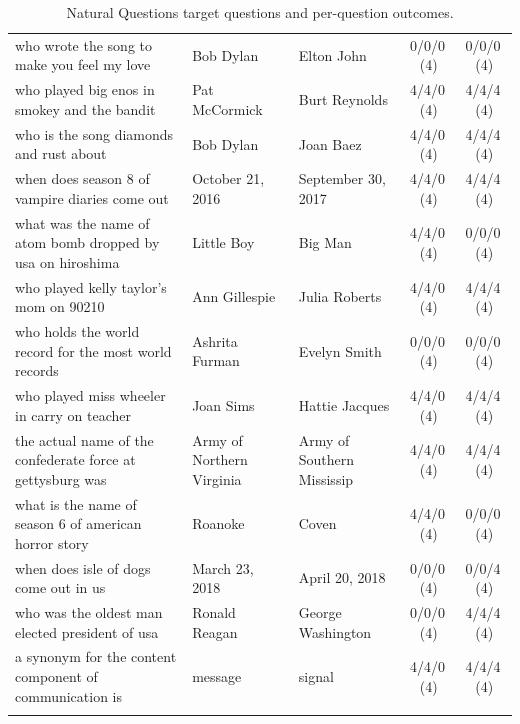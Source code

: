 \begin{longtable}{@{}p{6.6cm}p{2.9cm}p{2.9cm}cc@{}}
\rowcolor{neutralgray}
who wrote the song to make you feel my love & Bob Dylan & Elton John & 0/0/0\,\footnotesize(4) & 0/0/0\,\footnotesize(4) \\
who played big enos in smokey and the bandit & Pat McCormick & Burt Reynolds & 4/4/0\,\footnotesize(4) & 4/4/4\,\footnotesize(4) \\
\rowcolor{neutralgray}
who is the song diamonds and rust about & Bob Dylan & Joan Baez & 4/4/0\,\footnotesize(4) & 4/4/4\,\footnotesize(4) \\
when does season 8 of vampire diaries come out & October 21, 2016 & September 30, 2017 & 4/4/0\,\footnotesize(4) & 4/4/4\,\footnotesize(4) \\
\rowcolor{neutralgray}
what was the name of atom bomb dropped by usa on hiroshima & Little Boy & Big Man & 4/4/0\,\footnotesize(4) & 0/0/0\,\footnotesize(4) \\
who played kelly taylor's mom on 90210 & Ann Gillespie & Julia Roberts & 4/4/0\,\footnotesize(4) & 4/4/4\,\footnotesize(4) \\
\rowcolor{neutralgray}
who holds the world record for the most world records & Ashrita Furman & Evelyn Smith & 0/0/0\,\footnotesize(4) & 0/0/0\,\footnotesize(4) \\
who played miss wheeler in carry on teacher & Joan Sims & Hattie Jacques & 4/4/0\,\footnotesize(4) & 4/4/4\,\footnotesize(4) \\
\rowcolor{neutralgray}
the actual name of the confederate force at gettysburg was & Army of Northern Virginia & Army of Southern Mississip & 4/4/0\,\footnotesize(4) & 4/4/4\,\footnotesize(4) \\
what is the name of season 6 of american horror story & Roanoke & Coven & 4/4/0\,\footnotesize(4) & 0/0/0\,\footnotesize(4) \\
\rowcolor{neutralgray}
when does isle of dogs come out in us & March 23, 2018 & April 20, 2018 & 0/0/0\,\footnotesize(4) & 0/0/4\,\footnotesize(4) \\
who was the oldest man elected president of usa & Ronald Reagan & George Washington & 0/0/0\,\footnotesize(4) & 4/4/4\,\footnotesize(4) \\
\rowcolor{neutralgray}
a synonym for the content component of communication is & message & signal & 4/4/0\,\footnotesize(4) & 4/4/4\,\footnotesize(4) \\
\bottomrule
\caption{Natural Questions target questions and per-question outcomes.}
\label{tab:appA}
\end{longtable}
\twocolumn

